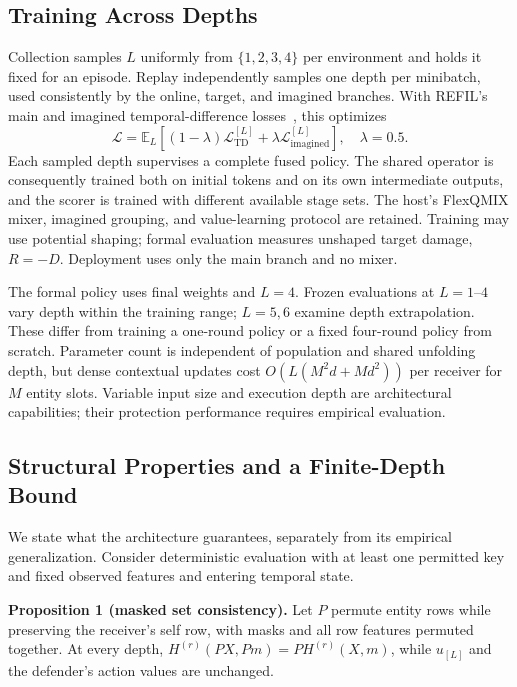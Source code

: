 \subsection{Training Across Depths}
Collection samples $L$ uniformly from $\{1,2,3,4\}$ per environment and holds it fixed for an episode. Replay independently samples one depth per minibatch, used consistently by the online, target, and imagined branches. With REFIL's main and imagined temporal-difference losses~\cite{iqbal2021refil}, this optimizes
\begin{equation}
 \mathcal L=\mathbb E_L
 \left[(1-\lambda)\mathcal L_{\mathrm{TD}}^{[L]}
       +\lambda\mathcal L_{\mathrm{imagined}}^{[L]}\right],\quad\lambda=0.5.
 \label{eq:td-loss}
\end{equation}
Each sampled depth supervises a complete fused policy. The shared operator is consequently trained both on initial tokens and on its own intermediate outputs, and the scorer is trained with different available stage sets. The host's FlexQMIX mixer, imagined grouping, and value-learning protocol are retained. Training may use potential shaping; formal evaluation measures unshaped target damage, $R=-D$. Deployment uses only the main branch and no mixer.

The formal policy uses final weights and $L=4$. Frozen evaluations at $L=1$--$4$ vary depth within the training range; $L=5,6$ examine depth extrapolation. These differ from training a one-round policy or a fixed four-round policy from scratch. Parameter count is independent of population and shared unfolding depth, but dense contextual updates cost $O(L(M^2d+Md^2))$ per receiver for $M$ entity slots. Variable input size and execution depth are architectural capabilities; their protection performance requires empirical evaluation.

\subsection{Structural Properties and a Finite-Depth Bound}
We state what the architecture guarantees, separately from its empirical generalization. Consider deterministic evaluation with at least one permitted key and fixed observed features and entering temporal state.

\noindent\textbf{Proposition 1 (masked set consistency).}
Let $P$ permute entity rows while preserving the receiver's self row, with masks and all row features permuted together. At every depth, $H^{(r)}(PX,Pm)=P H^{(r)}(X,m)$, while $u_{[L]}$ and the defender's action values are unchanged.

